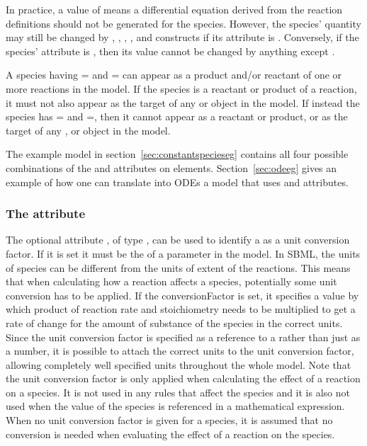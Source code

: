 In practice, a  value of  means
a differential equation derived from the reaction definitions
should not be generated for the species.  However, the species'
quantity may still be changed by \AssignmentRule, \RateRule,
\AlgebraicRule, \Event, and \InitialAssignment constructs if its
 attribute is .  Conversely, if the
species'  attribute is , then its value
cannot be changed by anything except \InitialAssignment.

A species having = and
= can appear as a product and/or
reactant of one or more reactions in the model.  If the species is
a reactant or product of a reaction, it must not also appear as
the target of any \AssignmentRule or \RateRule object in the
model.  If instead the species has
= and
=, then it cannot appear as a reactant
or product, or as the target of any \AssignmentRule, \RateRule or
\EventAssignment object in the model.

The example model in section~\ref{sec:constantspecieseg} contains
all four possible combinations of the 
and  attributes on  elements.
Section~\ref{sec:odeeg} gives an example of how one can translate
into ODEs a model that uses  and
 attributes.


\subsubsection{The  attribute}
\label{sec:species-conversion}

The optional attribute , of type
, can be used to identify a \Parameter as a 
unit conversion factor. If it is set it must be the  
of a parameter in the model. 
In SBML, the units of species can be different from the units of extent 
of the reactions. This means that when calculating how a reaction affects
a species, potentially some unit conversion has to be applied. 
If the conversionFactor is set, it specifies a value by which product of
reaction rate and stoichiometry needs to be multiplied to get a rate of change 
for the amount of substance of the species in the correct units. 
Since the unit conversion factor is specified as a reference to a \Parameter 
rather than just as a number, it is possible to attach the correct units
to the unit conversion factor, allowing completely well specified units
throughout the whole model. 
Note that the unit conversion factor is only applied when calculating the 
effect of a reaction on a species. It is not used in any rules that 
affect the species and it is also not used when the value of the species is
referenced in a mathematical expression.
When no unit conversion factor is given for a species, it is assumed 
that no conversion is needed when evaluating the effect of a reaction on 
the species.


